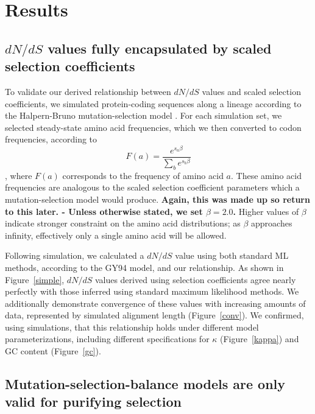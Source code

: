 \documentclass[11pt]{article}
\begin{document}
\section*{Results}

\subsection*{$dN/dS$ values fully encapsulated by scaled selection coefficients}

To validate our derived relationship between $dN/dS$ values and scaled selection coefficients, we simulated protein-coding sequences along a lineage according to the Halpern-Bruno mutation-selection model \cite{HalpernBruno1998}. For each simulation set, we selected steady-state amino acid frequencies, which we then converted to codon frequencies, according to \begin{equation} F(a) = \frac{e^{s_a\beta}}{\sum_b e^{s_b\beta}} \end{equation}, where $F(a)$ corresponds to the frequency of amino acid $a$. These amino acid frequencies are analogous to the scaled selection coefficient parameters which a mutation-selection model would produce. \textbf{Again, this was made up so return to this later. - Unless otherwise stated, we set $\beta = 2.0$.} Higher values of $\beta$ indicate stronger constraint on the amino acid distributions; as $\beta$ approaches infinity, effectively only a single amino acid will be allowed. 

Following simulation, we calculated a $dN/dS$ value using both standard ML methods, according to the GY94 \cite{GoldmanYang1994} model, and our relationship. As shown in Figure~\ref{simple}, $dN/dS$ values derived using selection coefficients agree nearly perfectly with those inferred using standard maximum likelihood methods. We additionally demonstrate convergence of these values with increasing amounts of data, represented by simulated alignment length (Figure~\ref{conv}).
We confirmed, using simulations, that this relationship holds under different model parameterizations, including different specifications for $\kappa$ (Figure~\ref{kappa}) and GC content (Figure~\ref{gc}). 



\subsection*{Mutation-selection-balance models are only valid for purifying selection}
\end{document}
